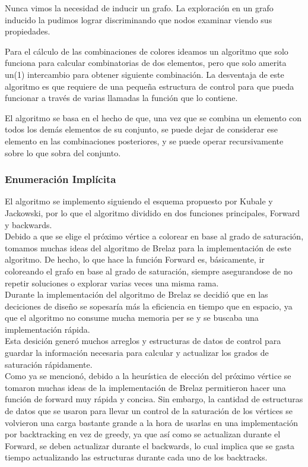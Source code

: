 \documentclass[a4paper,10pt]{article}
\begin{document}
Nunca vimos la necesidad de inducir un grafo. La exploración en un grafo
inducido la pudimos lograr discriminando que nodos examinar viendo sus
propiedades.

Para el cálculo de las combinaciones de colores ideamos un algoritmo que
solo funciona para calcular combinatorias de dos elementos, pero que
solo amerita un(1) intercambio para obtener siguiente combinación. La
desventaja de este algoritmo es que requiere de una pequeña estructura
de control para que pueda funcionar a través de varias llamadas la
función que lo contiene.

El algoritmo se basa en el hecho de que, una vez que se combina un
elemento con todos los demás elementos de su conjunto, se puede dejar de
considerar ese elemento en las combinaciones posteriores, y se puede
operar recursivamente sobre lo que sobra del conjunto.


\subsubsection{Enumeración Implícita}
El algoritmo se implemento siguiendo el esquema propuesto por Kubale y
Jackowski, por lo que el algoritmo dividido en dos funciones principales,
Forward y backwards.\\

\indent Debido a que se elige el pr\'oximo v\'ertice a colorear en base al grado de
saturaci\'on, tomamos muchas ideas del algoritmo de Brelaz para la
implementaci\'on de este algoritmo. De hecho, lo que hace la funci\'on
Forward es, b\'asicamente, ir coloreando el grafo en base al grado de
saturaci\'on, siempre asegurandose de no repetir soluciones o explorar
varias veces una misma rama.\\

\indent Durante la implementaci\'on del algoritmo de Brelaz se decidi\'o
que en las deciciones de dise\~no se sopesar\'ia m\'as la eficiencia en
tiempo que en espacio, ya que el algoritmo no consume mucha memoria per
se y se buscaba una implementaci\'on r\'apida.\\

\indent Esta desici\'on gener\'o muchos arreglos y estructuras de datos
de control para guardar la informaci\'on necesaria para calcular y
actualizar los grados de saturaci\'on r\'apidamente.\\

\indent Como ya se mencion\'o, debido a la heur\'istica de elecci\'on
del pr\'oximo v\'ertice se tomaron muchas ideas de la implementaci\'on
de Brelaz permitieron hacer una funci\'on de forward muy
r\'apida y concisa. Sin embargo, la cantidad de estructuras de datos que
se usaron para llevar un control de la saturaci\'on de los v\'ertices se
volvieron una carga bastante grande a la hora de usarlas en una
implementaci\'on por backtracking en vez de greedy, ya que as\'i como se
actualizan durante el Forward, se deben actualizar durante el backwards,
lo cual implica que se gasta tiempo actualizando las estructuras durante
cada uno de los backtracks.\\
\end{document}
